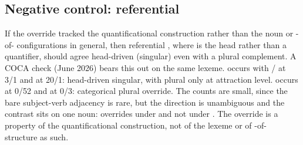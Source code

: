 \subsection{Negative control: referential }\label{sec:A-5}

If the override tracked the quantificational construction rather than the noun  or -of- configurations in general, then referential , where  is the head rather than a quantifier, should agree head-driven (singular) even with a plural complement. A COCA check (June 2026) bears this out on the same lexeme.  occurs with / at 3/1 and  at 20/1: head-driven singular, with plural only at attraction level.  occurs at 0/52 and  at 0/3: categorical plural override. The counts are small, since the bare subject-verb adjacency is rare, but the direction is unambiguous and the contrast sits on one noun:  overrides under  and not under . The override is a property of the quantificational construction, not of the lexeme or of -of- structure as such.
